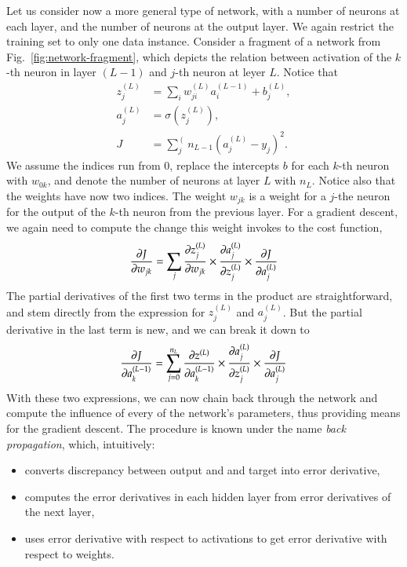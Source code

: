 \begin{refsection}
Let us consider now a more general type of network, with a number of neurons at each layer, and the number of neurons at the output layer. We again restrict the training set to only one data instance. Consider a fragment of a network from Fig.~\ref{fig:network-fragment}, which depicts the relation between activation of the $k$-th neuron in layer $(L-1)$ and $j$-th neuron at leyer $L$. Notice that
\begin{align}
z_j^{(L)} & = \sum_i w_{ji}^{(L)} a_i^{(L-1)} + b_j^{(L)}, \\
a_j^{(L)} & = \sigma(z_j^{(L)}), \\
J & = \sum_j^(n_{L-1}(a_j^{(L)}-y_j)^2.
\end{align}
We assume the indices run from 0, replace the intercepts $b$ for each $k$-th neuron with $w_{0k}$, and denote the number of neurons at layer $L$ with $n_L$. Notice also that the weights have now two indices. The weight $w_{jk}$ is a weight for a $j$-the neuron for the output of the $k$-th neuron from the previous layer. For a gradient descent, we again need to compute the change this weight invokes to the cost function,
\begin{equation}
\frac{\partial J}{\partial w_{jk}}=\sum_j\frac{\partial z_j^{(L)}}{\partial w_{jk}} \times \frac{\partial a_j^{(L)}}{\partial z_j^{(L)}} \times \frac{\partial J}{\partial a_j^{(L)}}
\end{equation}
The partial derivatives of the first two terms in the product are straightforward, and stem directly from the expression for $z_j^{(L)}$ and $a_j^{(L)}$. But the partial derivative in the last term is new, and we can break it down to
\begin{equation}
\frac{\partial J}{\partial a_k^{(L-1)}} = \sum_{j=0}^{n_L} \frac{\partial z^{(L)}}{\partial a_k^{(L-1)}} \times \frac{\partial a_j^{(L)}}{\partial z_j^{(L)}} \times \frac{\partial J}{\partial a_j^{(L)}}
\end{equation}
With these two expressions, we can now chain back through the network and compute the influence of every of the network's parameters, thus providing means for the gradient descent. The procedure is known under the name {\em back propagation}, which, intuitively:
\begin{itemize}
	\item converts discrepancy between output and and target into error derivative,
	\item computes the error derivatives in each hidden layer from error derivatives of the next layer,
	\item uses error derivative with respect to activations to get error derivative with respect to weights.
\end{itemize}


\end{refsection}
